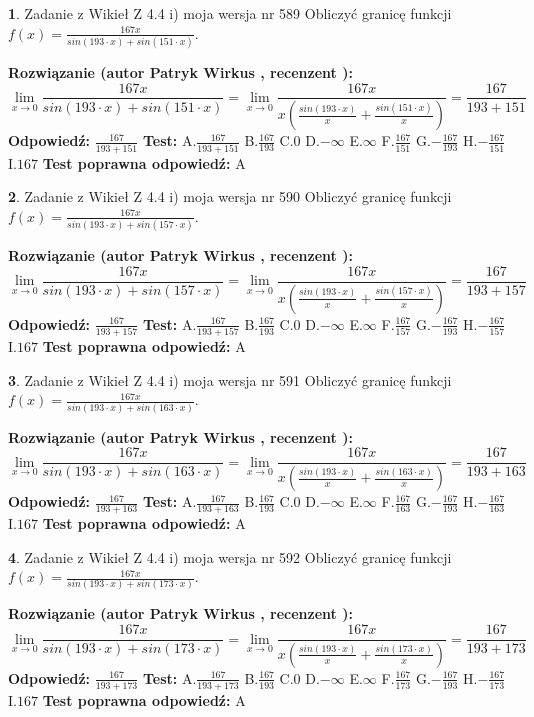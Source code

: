 \documentclass[12pt, a4paper]{article}
\theoremstyle{definition} %
\newtheorem{zad}{}
\newcommand{\zadStart}[1]{\begin{zad}#1\newline}
\newcommand{\zadStop}{\end{zad}}
\newcommand{\rozwStart}[2]{\noindent \textbf{Rozwiązanie (autor #1 , recenzent #2): }\newline}
\newcommand{\rozwStop}{\newline}
\newcommand{\odpStart}{\noindent \textbf{Odpowiedź:}\newline}
\newcommand{\odpStop}{\newline}
\newcommand{\testStart}{\noindent \textbf{Test:}\newline}
\newcommand{\testStop}{\newline}
\newcommand{\kluczStart}{\noindent \textbf{Test poprawna odpowiedź:}\newline}
\newcommand{\kluczStop}{\newline}
\begin{document}
\zadStart{Zadanie z Wikieł Z 4.4 i) moja wersja nr 589}
Obliczyć granicę funkcji $f(x)=\frac{167x}{sin(193\cdot x) +sin(151\cdot x)}$.
\zadStop
\rozwStart{Patryk Wirkus}{}
$$\lim\limits_{x\to 0}\frac{167x}{sin(193\cdot x) +sin(151\cdot x)}=\lim\limits_{x\to 0}\frac{167x}{x(\frac{sin(193\cdot x)}{x}+\frac{sin(151\cdot x)}{x})}=\frac{167}{193+151}$$
\rozwStop
\odpStart
$\frac{167}{193+151}$
\odpStop
\testStart
A.$\frac{167}{193+151}$
B.$\frac{167}{193}$
C.$0$
D.$-\infty$
E.$\infty$
F.$\frac{167}{151}$
G.$-\frac{167}{193}$
H.$-\frac{167}{151}$
I.$167$
\testStop
\kluczStart
A
\kluczStop



\zadStart{Zadanie z Wikieł Z 4.4 i) moja wersja nr 590}
Obliczyć granicę funkcji $f(x)=\frac{167x}{sin(193\cdot x) +sin(157\cdot x)}$.
\zadStop
\rozwStart{Patryk Wirkus}{}
$$\lim\limits_{x\to 0}\frac{167x}{sin(193\cdot x) +sin(157\cdot x)}=\lim\limits_{x\to 0}\frac{167x}{x(\frac{sin(193\cdot x)}{x}+\frac{sin(157\cdot x)}{x})}=\frac{167}{193+157}$$
\rozwStop
\odpStart
$\frac{167}{193+157}$
\odpStop
\testStart
A.$\frac{167}{193+157}$
B.$\frac{167}{193}$
C.$0$
D.$-\infty$
E.$\infty$
F.$\frac{167}{157}$
G.$-\frac{167}{193}$
H.$-\frac{167}{157}$
I.$167$
\testStop
\kluczStart
A
\kluczStop



\zadStart{Zadanie z Wikieł Z 4.4 i) moja wersja nr 591}
Obliczyć granicę funkcji $f(x)=\frac{167x}{sin(193\cdot x) +sin(163\cdot x)}$.
\zadStop
\rozwStart{Patryk Wirkus}{}
$$\lim\limits_{x\to 0}\frac{167x}{sin(193\cdot x) +sin(163\cdot x)}=\lim\limits_{x\to 0}\frac{167x}{x(\frac{sin(193\cdot x)}{x}+\frac{sin(163\cdot x)}{x})}=\frac{167}{193+163}$$
\rozwStop
\odpStart
$\frac{167}{193+163}$
\odpStop
\testStart
A.$\frac{167}{193+163}$
B.$\frac{167}{193}$
C.$0$
D.$-\infty$
E.$\infty$
F.$\frac{167}{163}$
G.$-\frac{167}{193}$
H.$-\frac{167}{163}$
I.$167$
\testStop
\kluczStart
A
\kluczStop



\zadStart{Zadanie z Wikieł Z 4.4 i) moja wersja nr 592}
Obliczyć granicę funkcji $f(x)=\frac{167x}{sin(193\cdot x) +sin(173\cdot x)}$.
\zadStop
\rozwStart{Patryk Wirkus}{}
$$\lim\limits_{x\to 0}\frac{167x}{sin(193\cdot x) +sin(173\cdot x)}=\lim\limits_{x\to 0}\frac{167x}{x(\frac{sin(193\cdot x)}{x}+\frac{sin(173\cdot x)}{x})}=\frac{167}{193+173}$$
\rozwStop
\odpStart
$\frac{167}{193+173}$
\odpStop
\testStart
A.$\frac{167}{193+173}$
B.$\frac{167}{193}$
C.$0$
D.$-\infty$
E.$\infty$
F.$\frac{167}{173}$
G.$-\frac{167}{193}$
H.$-\frac{167}{173}$
I.$167$
\testStop
\kluczStart
A
\kluczStop
\end{document}
